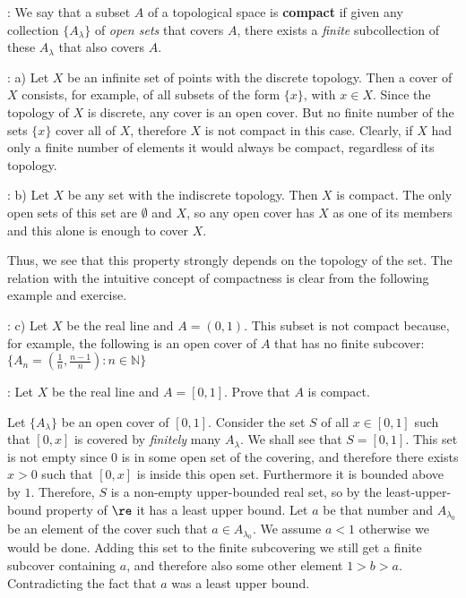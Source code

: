 : We say that a subset $A$ of a topological space is {\bf compact} if given any collection
$\{A_{\lambda}\}$ of {\it open sets} that covers $A$, there exists a {\it finite}
subcollection of these $A_{\lambda}$ that also covers $A$.

\ejem: a) Let $X$ be an infinite set of points with the discrete topology.
Then a cover of $X$ consists, for example, of all subsets of the form $\{x\}$, with $x \in X$. Since the topology of $X$ is
discrete, any cover is an open cover. But no finite number of the sets $\{x\}$
cover all of $X$, therefore $X$ is not compact in this case.
Clearly, if $X$ had only a finite number of elements
it would always be compact, regardless of its topology.

\ejem: b) Let $X$ be any set with the indiscrete topology.
Then $X$ is compact. The only open sets of this set are
$\emptyset$ and $X$, so any open cover has $X$ as
one of its members and this alone is enough to cover $X$.

Thus, we see that this property strongly depends on the topology
of the set. The relation with the intuitive concept of compactness
is clear from the following example and exercise.

\ejem: c) Let $X$ be the real line and $A = (0,1)$. This subset is not compact
because, for example, the following is an open cover of $A$ that has no finite subcover: $\{ A_n = (\frac{1}{n}, \frac{n-1}{n}) \colon n \in \mathbb{N}\}$

\ejer: Let $X$ be the real line and $A = [0,1]$. Prove that $A$ is compact.

\bpru

Let $\{A_{\lambda}\}$ be an open cover of $[0,1]$. 
Consider the set $S$ of all $x \in [0,1]$ such that $[0,x]$ is covered by \textit{finitely} many $A_\lambda$. We shall see that $S=[0,1]$.
This set is not empty since $0$ is in some open set of the covering, and therefore there exists $x > 0$ such that $[0,x]$ is inside this open set. Furthermore it is bounded above by $1$.
Therefore, $S$ is a non-empty upper-bounded real set, so by the least-upper-bound property of $\re$ it has a least upper bound. Let $a$ be that number and $A_{\lambda_0}$ be an element of the cover such that $a \in A_{\lambda_0}$. We assume $a < 1$ otherwise we would be done.
Adding this set to the finite subcovering we still get a finite subcover containing $a$, and therefore also some other element $1> b>a$. 
Contradicting the fact that $a$ was a least upper bound.

\epru

